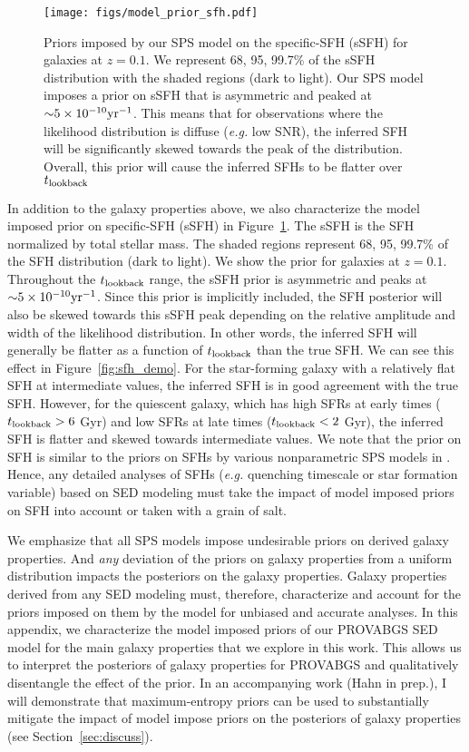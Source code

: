 \begin{figure}
\begin{center}
\texttt{[image: figs/model\_prior\_sfh.pdf]}
    \caption{
        Priors imposed by our SPS model on the specific-SFH (sSFH) for galaxies
        at $z=0.1$. 
        We represent 68, 95, 99.7\% of the sSFH distribution with the shaded
        regions (dark to light). 
        Our SPS model imposes a prior on sSFH that is asymmetric and peaked at 
        ${\sim}5\times10^{-10}{\rm yr}^{-1}$. 
        This means that for observations where the likelihood distribution is
        diffuse (\emph{e.g.} low SNR), the inferred SFH will be significantly
        skewed towards the peak of the distribution. 
        Overall, this prior will cause the inferred SFHs to be flatter over
        $t_{\rm lookback}$
    }\label{fig:sfh_prior}
\end{center}
\end{figure}
In addition to the galaxy properties above, we also characterize the model
imposed prior on specific-SFH (sSFH) in Figure~\ref{fig:sfh_prior}. 
The sSFH is the SFH normalized by total stellar mass. 
The shaded regions represent 68, 95, 99.7\% of the SFH distribution (dark to
light). 
We show the prior for galaxies at $z=0.1$. 
Throughout the $t_{\rm lookback}$ range, the sSFH prior is asymmetric and peaks at
${\sim}5\times10^{-10}{\rm yr}^{-1}$. 
Since this prior is implicitly included, the SFH posterior will also be skewed
towards this sSFH peak depending on the relative amplitude and width of the
likelihood distribution. 
In other words, the inferred SFH will generally be flatter as a function of
$t_{\rm lookback}$ than the true SFH. 
We can see this effect in Figure~\ref{fig:sfh_demo}. 
For the star-forming galaxy with a relatively flat SFH at intermediate values,
the inferred SFH is in good agreement with the true SFH. 
However, for the quiescent galaxy, which has high SFRs at early times ($t_{\rm lookback} >
6$ Gyr) and low SFRs at late times ($t_{\rm lookback} < 2$ Gyr), the inferred SFH is
flatter and skewed towards intermediate values. 
We note that the prior on SFH is similar to the priors on SFHs by various
nonparametric SPS models in \cite{leja2019}. 
Hence, any detailed analyses of SFHs (\emph{e.g.} quenching timescale or star
formation variable) based on SED modeling must take the impact of model imposed
priors on SFH into account or taken with a grain of salt.  

We emphasize that all SPS models impose undesirable priors on derived galaxy
properties. 
And \emph{any} deviation of the priors on galaxy properties from a uniform
distribution impacts the posteriors on the galaxy properties. 
Galaxy properties derived from any SED modeling must, therefore, characterize
and account for the priors imposed on them by the model for unbiased and
accurate analyses. 
In this appendix, we characterize the model imposed priors of our PROVABGS SED
model for the main galaxy properties that we explore in this work. 
This allows us to interpret the posteriors of galaxy properties for PROVABGS
and qualitatively disentangle the effect of the prior. 
In an accompanying work (Hahn in prep.), I will demonstrate that
maximum-entropy priors can be used to substantially mitigate the impact of
model impose priors on the posteriors of galaxy properties
(see Section~\ref{sec:discuss}). 
